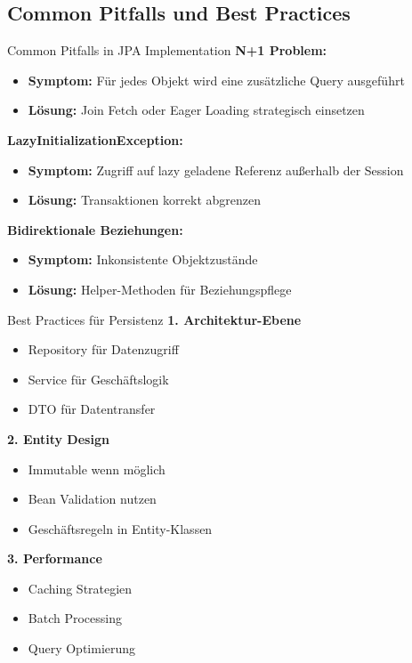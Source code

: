 \subsection{Common Pitfalls und Best Practices}

\begin{concept}{Common Pitfalls in JPA Implementation}
\textbf{N+1 Problem:}
\begin{itemize}
    \item \textbf{Symptom:} Für jedes Objekt wird eine zusätzliche Query ausgeführt
    \item \textbf{Lösung:} Join Fetch oder Eager Loading strategisch einsetzen
\end{itemize}

\textbf{LazyInitializationException:}
\begin{itemize}
    \item \textbf{Symptom:} Zugriff auf lazy geladene Referenz außerhalb der Session
    \item \textbf{Lösung:} Transaktionen korrekt abgrenzen
\end{itemize}

\textbf{Bidirektionale Beziehungen:}
\begin{itemize}
    \item \textbf{Symptom:} Inkonsistente Objektzustände
    \item \textbf{Lösung:} Helper-Methoden für Beziehungspflege
\end{itemize}
\end{concept}

\begin{KR}{Best Practices für Persistenz}
\textbf{1. Architektur-Ebene}
\begin{itemize}
    \item Repository für Datenzugriff
    \item Service für Geschäftslogik
    \item DTO für Datentransfer
\end{itemize}

\textbf{2. Entity Design}
\begin{itemize}
    \item Immutable wenn möglich
    \item Bean Validation nutzen
    \item Geschäftsregeln in Entity-Klassen
\end{itemize}

\textbf{3. Performance}
\begin{itemize}
    \item Caching Strategien
    \item Batch Processing
    \item Query Optimierung
\end{itemize}
\end{KR}

